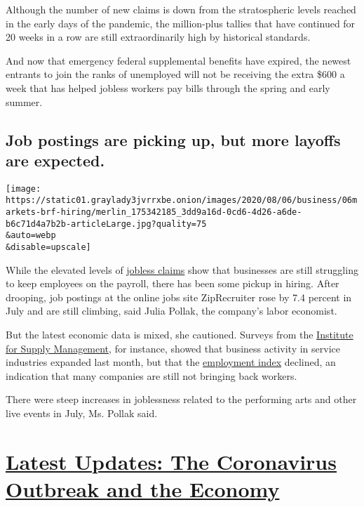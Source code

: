 Although the number of new claims is down from the stratospheric levels
reached in the early days of the pandemic, the million-plus tallies that
have continued for 20 weeks in a row are still extraordinarily high by
historical standards.

And now that emergency federal supplemental benefits have expired, the
newest entrants to join the ranks of unemployed will not be receiving
the extra \$600 a week that has helped jobless workers pay bills through
the spring and early summer.

\hypertarget{job-postings-are-picking-up-but-more-layoffs-are-expected}{%
\subsection{Job postings are picking up, but more layoffs are
expected.}\label{job-postings-are-picking-up-but-more-layoffs-are-expected}}

\texttt{[image: https://static01.graylady3jvrrxbe.onion/images/2020/08/06/business/06markets-brf-hiring/merlin\_175342185\_3dd9a16d-0cd6-4d26-a6de-b6c71d4a7b2b-articleLarge.jpg?quality=75\\\&auto=webp\\\&disable=upscale]}

While the elevated levels of
\href{https://www.nytimes3xbfgragh.onion/live/2020/08/06/business/stock-market-today-coronavirus\#new-state-jobless-claims-decline-but-exceed-one-million-for-the-20th-week}{jobless
claims} show that businesses are still struggling to keep employees on
the payroll, there has been some pickup in hiring. After drooping, job
postings at the online jobs site ZipRecruiter rose by 7.4 percent in
July and are still climbing, said Julia Pollak, the company's labor
economist.

But the latest economic data is mixed, she cautioned. Surveys from the
\href{https://www.ismworld.org/}{Institute for Supply Management}, for
instance, showed that business activity in service industries expanded
last month, but that the
\href{https://www.nytimes3xbfgragh.onion/live/2020/08/06/business/stock-market-today-coronavirus\#as-unemployment-benefits-began-to-run-out-a-freelance-job-came-just-in-time}{employment
index} declined, an indication that many companies are still not
bringing back workers.

There were steep increases in joblessness related to the performing arts
and other live events in July, Ms. Pollak said.

\hypertarget{latest-updates-the-coronavirus-outbreak-and-the-economy}{%
\section{\texorpdfstring{\href{https://www.nytimes3xbfgragh.onion/live/2020/09/08/business/stock-market-today-coronavirus?action=click\&pgtype=Article\&state=default\&region=MAIN_CONTENT_1\&context=storylines_live_updates}{Latest
Updates: The Coronavirus Outbreak and the
Economy}}{Latest Updates: The Coronavirus Outbreak and the Economy}}\label{latest-updates-the-coronavirus-outbreak-and-the-economy}}

